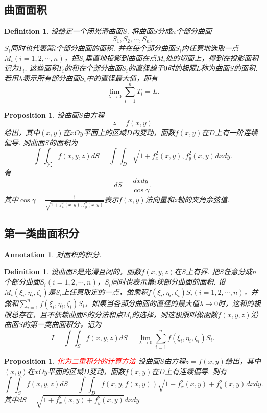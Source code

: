 \documentclass{article}
\newtheorem{proposition}[theorem]{Proposition}
\newtheorem{definition}[theorem]{Definition}
\newtheorem{annotation}[theorem]{Annotation}
\newcommand{\redt}[1]{\textcolor{red}{#1}}
\begin{document}
\subsection{曲面面积}

\begin{definition}
\rm 设给定一个闭光滑曲面$S$. 将曲面$S$分成$n$个部分曲面
$$
S_1, S_2,\cdots,S_n,
$$
$S_i$同时也代表第$i$个部分曲面的面积. 并在每个部分曲面$S_i$内任意地选取一点$M_i(i=1,2,\cdots,n)$，把$S_i$垂直地投影到曲面在点$M_i$处的切面上，得到在投影面积记为$T_i$. 这些面积$T_i$的和在个部分曲面$S_i$的直径趋于$0$时的极限$L$称为曲面$S$的面积. 若用$\lambda$表示所有部分曲面$S_i$中的直径最大值，即有
$$
\lim\limits_{\lambda \to 0}\sum\limits_{i=1}^n T_i = L.
$$
\end{definition}

\begin{proposition}
\rm 设曲面$S$由方程
$$
z=f(x,y)
$$
给出，其中$(x,y)$在$xOy$平面上的区域$D$内变动，函数$f(x,y)$在$D$上有一阶连续偏导. 则曲面$S$的面积为
$$
\int\int_\sum f(x,y,z)dS = \int\int_D\sqrt{1+f_x^2(x,y),f_y^2(x,y)}dxdy.
$$
有
$$
dS = \frac{dxdy}{\cos \gamma}.
$$
其中$\cos\gamma = \frac{1}{\sqrt{1+f_x^2(x,y),f_y^2(x,y)}}$表示$f(x,y)$法向量和$z$轴的夹角余弦值. 
\end{proposition}

\subsection{第一类曲面积分}

\begin{annotation}
\rm 对面积的积分.
\end{annotation}

\begin{definition}
\rm 设曲面$S$是光滑且闭的，函数$f(x,y,z)$在$S$上有界. 把$S$任意分成$n$个部分曲面$S_i(i=1,2,\cdots,n)$，$S_i$同时也表示第$i$块部分曲面的面积. 设$M_i(\xi_i,\eta_i,\zeta_i)$是$S_i$上任意取定的一点，做乘积$f(\xi_i,\eta_i,\zeta_i)S_i(i=1,2,\cdots,n)$，并做和$\sum\limits_{i=1}^n f(\xi_i,\eta_i,\zeta_i)S_i$，如果当各部分曲面的直径的最大值$\lambda \to 0$时，这和的极限总存在，且不依赖曲面$S$的分法和点$M_i$的选择，则这极限叫做函数$f(x,y,z)$沿曲面$S$的第一类曲面积分，记为
$$
I = \int\int_{S} f(x,y,z)dS = \lim\limits_{\lambda \to 0}\sum\limits_{i=1}^n f(\xi_i,\eta_i,\zeta_i)S_i.
$$
\end{definition}

\begin{proposition}
\rm \redt{化为二重积分的计算方法} 设曲面$S$由方程$z=f(x,y)$给出，其中$(x,y)$在$xOy$平面的区域$D$变动，函数$f(x,y)$在$D$上有连续偏导. 则有
$$
\int\int_S f(x,y,z)dS = \int\int_D f(x,y,f(x,y))\sqrt{1+f_x^2(x,y)+f_y^2(x,y)}dxdy. 
$$
其中$dS = \sqrt{1+f_x^2(x,y)+f_y^2(x,y)}dxdy$
\end{proposition}
\end{document}
